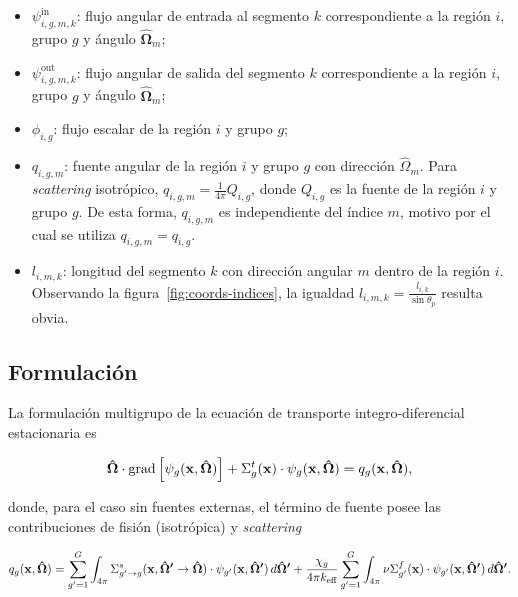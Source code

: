 \documentclass[11pt]{article}
\numberwithin{equation}{section}
\renewcommand{\vec}[1]{\ensuremath\mathbf{#1}}
\begin{document}
\begin{itemize}
\renewcommand\labelitemi{$\cdot$}
 \item $\psi^{\text{in}}_{i,g,m,k}$: flujo angular de entrada al segmento $k$ correspondiente a la región $i$, grupo $g$ y ángulo $\boldsymbol{\hat{\Omega}}_m$;
 \item $\psi^{\text{out}}_{i,g,m,k}$: flujo angular de salida del segmento $k$ correspondiente a la región $i$, grupo $g$ y ángulo $\boldsymbol{\hat{\Omega}}_m$;
 \item $\phi_{i,g}$: flujo escalar de la región $i$ y grupo $g$;
 \item $q_{i,g,m}$: fuente angular de la región $i$ y grupo $g$ con dirección $\hat{\Omega}_m$. Para \emph{scattering} isotrópico, $q_{i,g,m} = \frac{1}{4\pi}Q_{i,g}$, donde $Q_{i,g}$ es la fuente de la región $i$ y grupo $g$. De esta forma, $q_{i,g,m}$ es independiente del índice $m$, motivo por el cual se utiliza $q_{i,g,m} = q_{i,g}$.
 \item $l_{i,m,k}$: longitud del segmento $k$ con dirección angular $m$ dentro de la región $i$. Observando la figura~\ref{fig:coords-indices}, la igualdad $l_{i,m,k} = \frac{l_{i,k}}{\sin \theta_p}$ resulta obvia.
\end{itemize}

\subsection{Formulación}

La formulación multigrupo de la ecuación de transporte integro-diferencial estacionaria es~\cite{henry,lamarsh,duderstadt,glasstone,lewis,stammler,handbook-ingnuclear}

\begin{equation}
 \label{eq:transportemultigrupo}
 \boldsymbol{\hat{\Omega}} \cdot \text{grad} \left[ \psi_g(\vec{x}, \boldsymbol{\hat{\Omega}}) \right]
 + \Sigma^t_g(\vec{x}) \cdot \psi_g(\vec{x}, \boldsymbol{\hat{\Omega}}) = q_g(\vec{x}, \boldsymbol{\hat{\Omega}}),
\end{equation}

\noindent
donde, para el caso sin fuentes externas, el término de fuente posee las contribuciones de fisión (isotrópica) y \emph{scattering}

\begin{equation} \label{eq:fuentemultigrupo-1}
 q_g(\vec{x}, \boldsymbol{\hat{\Omega}}) =
 \sum_{g^\prime=1}^G \int_{4\pi} \Sigma^s_{g^\prime \rightarrow g}(\vec{x}, \boldsymbol{\hat{\Omega}^\prime} \rightarrow \boldsymbol{\hat{\Omega}}) \cdot \psi_{g^\prime}(\vec{x}, \boldsymbol{\hat{\Omega}^\prime}) \, d\boldsymbol{\hat{\Omega}^\prime} 
 + \frac{\chi_g}{4\pi k_{\text{eff}}} \sum_{g^\prime=1}^G \int_{4\pi} \nu\Sigma^f_{g^\prime}(\vec{x}) \cdot \psi_{g^\prime}(\vec{x}, \boldsymbol{\hat{\Omega}^\prime}) \, d\boldsymbol{\hat{\Omega}^\prime}.
\end{equation}
\end{document}
